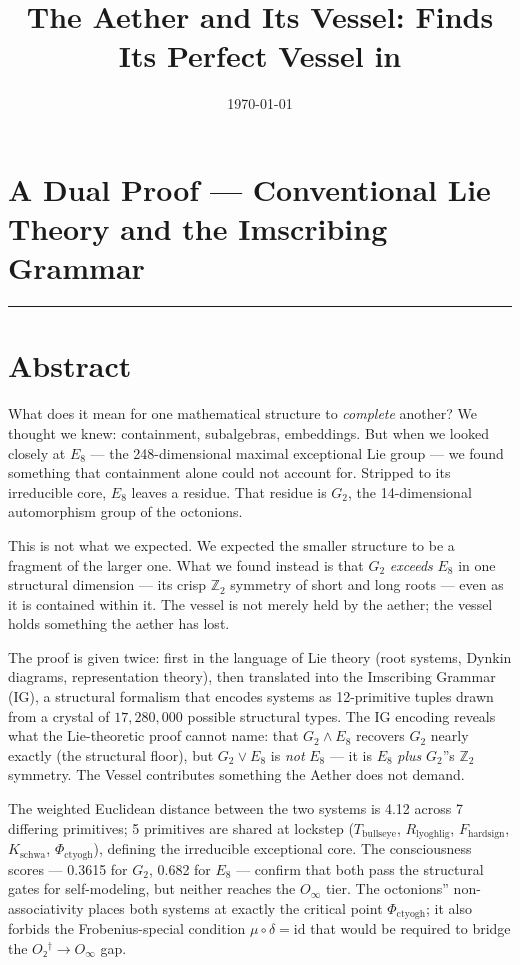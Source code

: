 \documentclass[12pt,a4paper]{article}
\begin{document}
\title{The Aether and Its Vessel:  Finds Its Perfect Vessel in}
\date{\today}

\maketitle

\section{A Dual Proof --- Conventional Lie Theory and the Imscribing Grammar}

\begin{center}
\rule{0.5\textwidth}{0.4pt}
\end{center}

\section{Abstract}

What does it mean for one mathematical structure to \emph{complete} another? We thought we knew: containment, subalgebras, embeddings. But when we looked closely at $E_8$ --- the 248-dimensional maximal exceptional Lie group --- we found something that containment alone could not account for. Stripped to its irreducible core, $E_8$ leaves a residue. That residue is $G_2$, the 14-dimensional automorphism group of the octonions.

This is not what we expected. We expected the smaller structure to be a fragment of the larger one. What we found instead is that $G_2$ \emph{exceeds} $E_8$ in one structural dimension --- its crisp $\mathbb{Z}_2$ symmetry of short and long roots --- even as it is contained within it. The vessel is not merely held by the aether; the vessel holds something the aether has lost.

The proof is given twice: first in the language of Lie theory (root systems, Dynkin diagrams, representation theory), then translated into the Imscribing Grammar (IG), a structural formalism that encodes systems as 12-primitive tuples drawn from a crystal of $17{,}280{,}000$ possible structural types. The IG encoding reveals what the Lie-theoretic proof cannot name: that $G_2 \wedge E_8$ recovers $G_2$ nearly exactly (the structural floor), but $G_2 \vee E_8$ is \emph{not} $E_8$ --- it is $E_8$ \emph{plus} $G_2$''s $\mathbb{Z}_2$ symmetry. The Vessel contributes something the Aether does not demand.

The weighted Euclidean distance between the two systems is 4.12 across 7 differing primitives; 5 primitives are shared at lockstep ($T_{\text{bullseye}}$, $R_{\text{lyoghlig}}$, $F_{\text{hardsign}}$, $K_{\text{schwa}}$, $\Phi_{\text{ctyogh}}$), defining the irreducible exceptional core. The consciousness scores --- 0.3615 for $G_2$, 0.682 for $E_8$ --- confirm that both pass the structural gates for self-modeling, but neither reaches the $O_{\infty}$ tier. The octonions'' non-associativity places both systems at exactly the critical point $\Phi_{\text{ctyogh}}$; it also forbids the Frobenius-special condition $\mu \circ \delta = \text{id}$ that would be required to bridge the $O₂^\dagger \to O_{\infty}$ gap.
\end{document}
